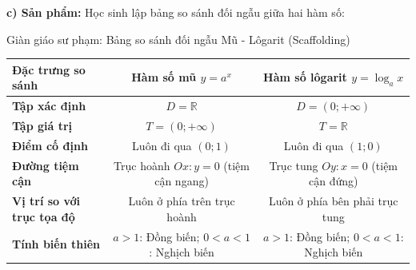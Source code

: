 \documentclass[12pt, a4paper]{article}
\begin{document}
\begin{center}
\end{center}

\noindent \textbf{c) Sản phẩm:}
Học sinh lập bảng so sánh đối ngẫu giữa hai hàm số:
\begin{scaffoldbox}{Giàn giáo sư phạm: Bảng so sánh đối ngẫu Mũ - Lôgarit (Scaffolding)}
\begin{center}
\small
\begin{tabular}{|l|c|c|}
    \hline
    \textbf{Đặc trưng so sánh} & \textbf{Hàm số mũ $y = a^x$} & \textbf{Hàm số lôgarit $y = \log_a x$} \\ \hline
    \textbf{Tập xác định} & $D = \mathbb{R}$ & $D = (0; +\infty)$ \\ \hline
    \textbf{Tập giá trị} & $T = (0; +\infty)$ & $T = \mathbb{R}$ \\ \hline
    \textbf{Điểm cố định} & Luôn đi qua $(0; 1)$ & Luôn đi qua $(1; 0)$ \\ \hline
    \textbf{Đường tiệm cận} & Trục hoành $Ox: y = 0$ (tiệm cận ngang) & Trục tung $Oy: x = 0$ (tiệm cận đứng) \\ \hline
    \textbf{Vị trí so với trục tọa độ} & Luôn ở phía trên trục hoành & Luôn ở phía bên phải trục tung \\ \hline
    \textbf{Tính biến thiên} & $a > 1$: Đồng biến; $0 < a < 1$: Nghịch biến & $a > 1$: Đồng biến; $0 < a < 1$: Nghịch biến \\ \hline
\end{tabular}
\end{center}
\end{scaffoldbox}
\end{document}
